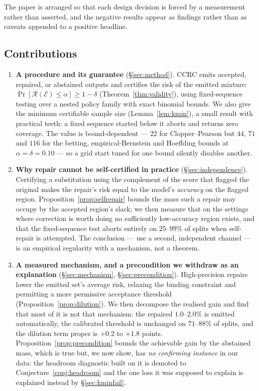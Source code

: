 \documentclass{article}
\theoremstyle{plain}
\theoremstyle{definition}
\theoremstyle{remark}
\newcommand{\Risk}{\mathcal{R}}
\newcommand{\emit}{\mathcal{E}}
\begin{document}
\medskip
The paper is arranged so that each design decision is forced by a measurement rather than
asserted, and the negative results appear as findings rather than as caveats appended to a
positive headline.

\subsection{Contributions}
\begin{enumerate}
\item \textbf{A procedure and its guarantee} (\S\ref{sec:method}). CCRC emits accepted,
repaired, or abstained outputs and certifies the risk of the emitted mixture:
$\Pr[\Risk(\emit)\le\alpha]\ge1-\delta$ (Theorem~\ref{thm:validity}), using
fixed-sequence testing over a nested policy family with exact binomial bounds. We also
give the minimum certifiable sample size (Lemma~\ref{lem:kmin}), a small result with
practical teeth: a fixed sequence started below it aborts and returns zero coverage. The
value is bound-dependent --- $22$ for Clopper--Pearson but $44$, $71$ and $116$ for the
betting, empirical-Bernstein and Hoeffding bounds at $\alpha=\delta=0.10$ --- so a grid start
tuned for one bound silently disables another.

\item \textbf{Why repair cannot be self-certified in practice}
(\S\ref{sec:independence}). Certifying a substitution using the complement of the score
that flagged the original makes the repair's risk equal to the model's \emph{accuracy} on
the flagged region. Proposition~\ref{prop:selfrepair} bounds the mass such a repair may
occupy by the accepted region's slack; we then measure that on the settings where
correction is worth doing no sufficiently low-accuracy region exists, and that the
fixed-sequence test aborts entirely on $25$--$99\%$ of splits when self-repair is
attempted. The conclusion --- use a second, independent channel --- is an empirical
regularity with a mechanism, not a theorem.

\item \textbf{A measured mechanism, and a precondition we withdraw as an explanation}
(\S\ref{sec:mechanism}, \S\ref{sec:precondition}). High-precision repairs lower the emitted
set's average risk, relaxing the binding constraint and permitting a more permissive
acceptance threshold (Proposition~\ref{prop:dilution}). We then decompose the realised gain
and find that most of it is not that mechanism: the repaired $1.0$--$2.0\%$ is emitted
automatically, the calibrated threshold is unchanged on $71$--$88\%$ of splits, and the
dilution term proper is $+0.2$ to $+1.8$ points. Proposition~\ref{prop:precondition} bounds
the achievable gain by the abstained mass, which is true but, we now show, has \emph{no
confirming instance} in our data: the headroom diagnostic built on it is demoted to
Conjecture~\ref{conj:headroom} and the one loss it was supposed to explain is explained
instead by \S\ref{sec:kminfail}.


\end{enumerate}
\end{document}
